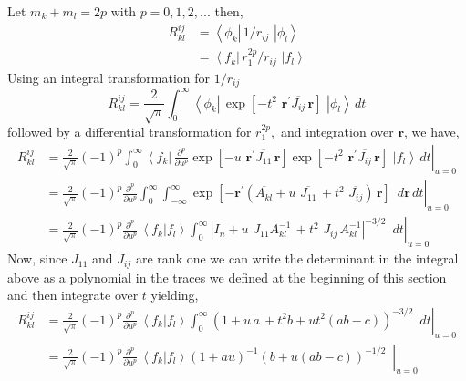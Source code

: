 \documentclass[12pt]{article}
\begin{document}
Let $m_{k}+m_{l}=2p$ with $p=0,1,2,...$ then,
\begin{align}
R_{kl}^{ij}  & =\left\langle \phi_{k}\right|  \,1/r_{ij}\,\mathbf{\,}\left|
\phi_{l}\right\rangle \\
& =\left\langle f_{k}\right|  \,r_{1}^{2p}/r_{ij}\,\mathbf{\,}\left|
f_{l}\right\rangle
\end{align}
Using an integral transformation for $1/r_{ij}$%
\begin{equation}
R_{kl}^{ij}=\frac{2}{\sqrt{\pi}}\int_{0}^{\infty}\left\langle \phi_{k}\right|
\,\exp\left[  -t^{2}\,\,\mathbf{r}^{\prime}\overline{J_{ij}}\,\mathbf{r}%
\right]  \,\mathbf{\,}\left|  \phi_{l}\right\rangle \,dt
\end{equation}
followed by a differential transformation for $r_{1}^{2p},$ and integration
over $\mathbf{r}$, we have,
\begin{align}
R_{kl}^{ij}  & =\left.  \frac{2}{\sqrt{\pi}}\left(  -1\right)  ^{p}\int
_{0}^{\infty}\left\langle f_{k}\right|  \,\frac{\partial^{p}}{\partial u^{p}%
}\exp\left[  -u\,\,\mathbf{r}^{\prime}\overline{J_{11}}\,\mathbf{r}\right]
\exp\left[  -t^{2}\,\,\mathbf{r}^{\prime}\overline{J_{ij}}\,\mathbf{r}\right]
\,\mathbf{\,}\left|  f_{l}\right\rangle \,dt\right|  _{u=0}\\
& =\left.  \frac{2}{\sqrt{\pi}}\left(  -1\right)  ^{p}\frac{\partial^{p}%
}{\partial u^{p}}\int_{0}^{\infty}\int_{-\infty}^{\infty}\exp\left[
-\mathbf{r}^{\prime}\left(  \overline{A_{kl}}+u\,\,\overline{J_{11}}%
\,+t^{2}\,\,\overline{J_{ij}}\right)  \,\mathbf{r}\right]  \,\mathbf{\,}%
\,d\mathbf{r}\,dt\right|  _{u=0}\\
& =\left.  \frac{2}{\sqrt{\pi}}\left(  -1\right)  ^{p}\frac{\partial^{p}%
}{\partial u^{p}}\,\left\langle f_{k}\right.  |\left.  f_{l}\right\rangle
\int_{0}^{\infty}\left|  I_{n}+u\,\,J_{11}A_{kl}^{-1}\,+t^{2}\,\,J_{ij}%
\,A_{kl}^{-1}\right|  ^{-3/2}\mathbf{\,}\,\,dt\right|  _{u=0}%
\end{align}
Now, since $J_{11}$ and $J_{ij}$ are rank one we can write the determinant in
the integral above as a polynomial in the traces we defined at the beginning
of this section and then integrate over $t$ yielding,
\begin{align}
R_{kl}^{ij}  & =\left.  \frac{2}{\sqrt{\pi}}\left(  -1\right)  ^{p}%
\frac{\partial^{p}}{\partial u^{p}}\,\left\langle f_{k}\right.  |\left.
f_{l}\right\rangle \int_{0}^{\infty}\left(  1+u\,a\,+t^{2}b+ut^{2}\left(
ab-c\right)  \right)  ^{-3/2}\mathbf{\,}\,\,dt\right|  _{u=0}\\
& =\left.  \frac{2}{\sqrt{\pi}}\left(  -1\right)  ^{p}\frac{\partial^{p}%
}{\partial u^{p}}\,\left\langle f_{k}\right.  |\left.  f_{l}\right\rangle
\left(  1+au\right)  ^{-1}\left(  b+u\left(  ab-c\right)  \right)
^{-1/2}\mathbf{\,}\,\,\right|  _{u=0}%
\end{align}
\end{document}
